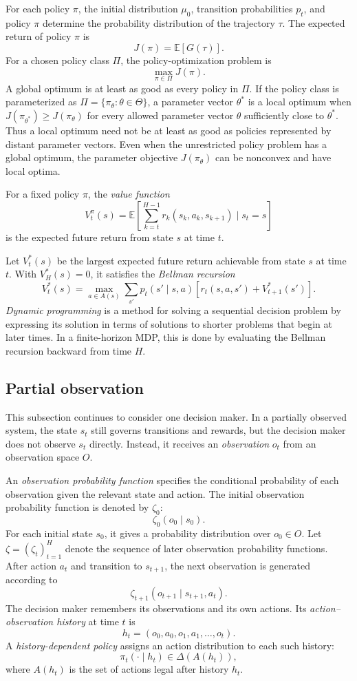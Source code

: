 For each policy $\pi$, the initial distribution $\mu_0$, transition probabilities $p_t$, and policy $\pi$ determine the probability distribution of the trajectory $\tau$. The expected return of policy $\pi$ is
\[
    J(\pi)
    =
    \mathbb{E}[G(\tau)].
\]
For a chosen policy class $\Pi$, the policy-optimization problem is
\[
    \max_{\pi\in\Pi}J(\pi).
\]
A global optimum is at least as good as every policy in $\Pi$. If the policy class is parameterized as $\Pi=\{\pi_\theta:\theta\in\Theta\}$, a parameter vector $\theta^\ast$ is a local optimum when $J(\pi_{\theta^\ast})\geq J(\pi_\theta)$ for every allowed parameter vector $\theta$ sufficiently close to $\theta^\ast$. Thus a local optimum need not be at least as good as policies represented by distant parameter vectors. Even when the unrestricted policy problem has a global optimum, the parameter objective $J(\pi_\theta)$ can be nonconvex and have local optima.

For a fixed policy $\pi$, the \emph{value function}
\[
    V_t^\pi(s)
    =
    \mathbb{E}
    \left[
      \sum_{k=t}^{H-1}
      r_k(s_k,a_k,s_{k+1})
      \mid s_t=s
    \right]
\]
is the expected future return from state $s$ at time $t$.

Let $V_t^\ast(s)$ be the largest expected future return achievable from state $s$ at time $t$. With $V_H^\ast(s)=0$, it satisfies the \emph{Bellman recursion}
\[
    V_t^\ast(s)
    =
    \max_{a\in A(s)}
    \sum_{s'}p_t(s'\mid s,a)
    \left[
      r_t(s,a,s')+V_{t+1}^\ast(s')
    \right].
\]
\emph{Dynamic programming} is a method for solving a sequential decision problem by expressing its solution in terms of solutions to shorter problems that begin at later times. In a finite-horizon MDP, this is done by evaluating the Bellman recursion backward from time $H$.


\subsection{Partial observation}

This subsection continues to consider one decision maker. In a partially observed system, the state $s_t$ still governs transitions and rewards, but the decision maker does not observe $s_t$ directly. Instead, it receives an \emph{observation} $o_t$ from an observation space $O$.

An \emph{observation probability function} specifies the conditional probability of each observation given the relevant state and action. The initial observation probability function is denoted by $\zeta_0$:
\[
    \zeta_0(o_0\mid s_0).
\]
For each initial state $s_0$, it gives a probability distribution over $o_0\in O$. Let $\zeta=(\zeta_t)_{t=1}^H$ denote the sequence of later observation probability functions. After action $a_t$ and transition to $s_{t+1}$, the next observation is generated according to
\[
    \zeta_{t+1}(o_{t+1}\mid s_{t+1},a_t).
\]
The decision maker remembers its observations and its own actions. Its \emph{action--observation history} at time $t$ is
\[
    h_t=(o_0,a_0,o_1,a_1,\ldots,o_t).
\]
A \emph{history-dependent policy} assigns an action distribution to each such history:
\[
    \pi_t(\cdot\mid h_t)\in\Delta(A(h_t)),
\]
where $A(h_t)$ is the set of actions legal after history $h_t$.

